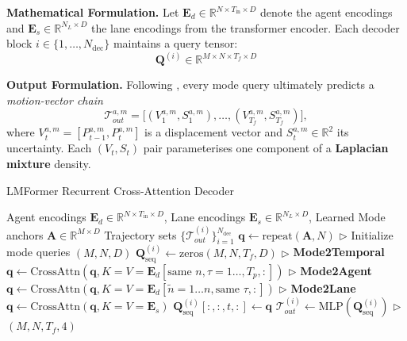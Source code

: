 \textbf{Mathematical Formulation.} Let \(\mathbf{E}_d \in \mathbb{R}^{N \times T_{\text{in}} \times D}\) denote the agent encodings and \(\mathbf{E}_s \in \mathbb{R}^{N_L \times D}\) the lane encodings from the transformer encoder. Each decoder block \(i \in \{1, \ldots, N_{\text{dec}}\}\) maintains a query tensor:
\begin{equation}
\mathbf{Q}^{(i)} \in \mathbb{R}^{M \times N \times T_f \times D}
\end{equation}

\textbf{Output Formulation.} Following \cite{lmformerYadav2025}, every mode query ultimately predicts a \emph{motion-vector chain}
\begin{equation}
\mathcal{T}_{out}^{a,m} = \bigl[(V_1^{a,m},S_1^{a,m}),\dots,(V_{T_f}^{a,m},S_{T_f}^{a,m})\bigr],
\end{equation}
where \(V_t^{a,m}=[P_{t-1}^{a,m},P_t^{a,m}]\) is a displacement vector and \(S_t^{a,m}\in\mathbb{R}^{2}\) its uncertainty. Each \( (V_t,S_t) \) pair parameterises one component of a \textbf{Laplacian mixture} density.

\begin{algorithm}[H]
\caption{LMFormer Recurrent Cross-Attention Decoder}
\label{alg:lmformer_decoder}
\begin{algorithmic}[1]
\REQUIRE Agent encodings \(\mathbf{E}_d \in \mathbb{R}^{N \times T_{\text{in}} \times D}\), Lane encodings \(\mathbf{E}_s \in \mathbb{R}^{N_L \times D}\), Learned Mode anchors \(\mathbf{A} \in \mathbb{R}^{M \times D}\)
\ENSURE Trajectory sets \(\{\mathcal{T}_{out}^{(i)}\}_{i=1}^{N_{\text{dec}}}\)
\STATE \(\mathbf{q} \leftarrow \text{repeat}(\mathbf{A}, N)\) \(\triangleright\) Initialize mode queries \((M, N, D)\)
    \STATE \(\mathbf{Q}_{\text{seq}}^{(i)} \leftarrow \text{zeros}(M, N, T_f, D)\)
        \STATE \(\triangleright\) \textbf{Mode2Temporal}
        \STATE \(\mathbf{q}\leftarrow \text{CrossAttn}(\mathbf{q}, K=V=\mathbf{E}_d[\text{same } n, \tau = 1\dots, T_p, :])\)
        \STATE \(\triangleright\) \textbf{Mode2Agent}
        \STATE \(\mathbf{q}\leftarrow \text{CrossAttn}(\mathbf{q}, K=V=\mathbf{E}_d[\tilde{n}=1\dots n, \text{same } \tau, :])\)
        \STATE \(\triangleright\) \textbf{Mode2Lane}
        \STATE \(\mathbf{q}\leftarrow \text{CrossAttn}(\mathbf{q}, K=V=\mathbf{E}_s)\)
        \STATE \(\mathbf{Q}_{\text{seq}}^{(i)}[:, :, t, :] \leftarrow \mathbf{q}\)
    \ENDFOR
    \STATE \(\mathcal{T}_{out}^{(i)} \leftarrow \text{MLP}(\mathbf{Q}_{\text{seq}}^{(i)})\) \(\triangleright\) \((M, N, T_f, 4)\)
\ENDFOR
\end{algorithmic}
\end{algorithm}

